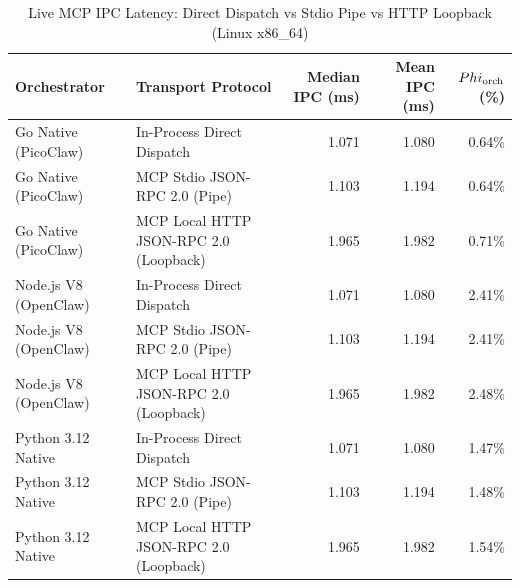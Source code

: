 \begin{table}[t]
\centering\small
\caption{Live MCP IPC Latency: Direct Dispatch vs Stdio Pipe vs HTTP Loopback (Linux x86_64)}
\label{tab:linux_mcp_transport}
\begin{tabular}{llrrr}
\toprule
Orchestrator & Transport Protocol & Median IPC (ms) & Mean IPC (ms) & $\\Phi_{\text{orch}}$ (\%) \\
\midrule
Go Native (PicoClaw) & In-Process Direct Dispatch & 1.071 & 1.080 & 0.64\% \\
Go Native (PicoClaw) & MCP Stdio JSON-RPC 2.0 (Pipe) & 1.103 & 1.194 & 0.64\% \\
Go Native (PicoClaw) & MCP Local HTTP JSON-RPC 2.0 (Loopback) & 1.965 & 1.982 & 0.71\% \\
Node.js V8 (OpenClaw) & In-Process Direct Dispatch & 1.071 & 1.080 & 2.41\% \\
Node.js V8 (OpenClaw) & MCP Stdio JSON-RPC 2.0 (Pipe) & 1.103 & 1.194 & 2.41\% \\
Node.js V8 (OpenClaw) & MCP Local HTTP JSON-RPC 2.0 (Loopback) & 1.965 & 1.982 & 2.48\% \\
Python 3.12 Native & In-Process Direct Dispatch & 1.071 & 1.080 & 1.47\% \\
Python 3.12 Native & MCP Stdio JSON-RPC 2.0 (Pipe) & 1.103 & 1.194 & 1.48\% \\
Python 3.12 Native & MCP Local HTTP JSON-RPC 2.0 (Loopback) & 1.965 & 1.982 & 1.54\% \\
\bottomrule
\end{tabular}
\end{table}
